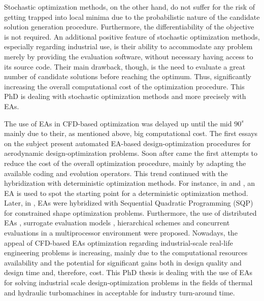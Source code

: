 Stochastic optimization methods, on the other hand, do not suffer for the risk of getting trapped into local minima due to the probabilistic nature of the candidate solution generation procedure. Furthermore, the differentiability of the objective is not required. An additional positive feature of stochastic optimization methods, especially regarding industrial use, is their ability to accommodate any problem merely by providing the evaluation software, without necessary having access to its source code. Their main drawback, though, is the need to evaluate a great number of candidate solutions before reaching the optimum. Thus, significantly increasing the overall computational cost of the optimization procedure. This PhD is dealing with  stochastic optimization methods and more precisely with EAs. 

The use of EAs in CFD-based optimization was delayed up until the mid $90^s$ mainly due to their, as mentioned above, big computational cost. The first essays on the subject \cite{kn:Quag95,per:95,kn:Gala96} present automated EA-based design-optimization procedures for aerodynamic design-optimization problems. Soon after came the first attempts to reduce the cost of the overall optimization procedure, mainly by adapting the available coding and evolution operators. This trend continued with the hybridization with deterministic optimization methods. For instance, in \cite{kn:Mar97} and \cite{kn:Fost97}, an EA is used to spot the starting point for a deterministic optimization method. Later, in \cite{dennis:99}, EAs were hybridized with Sequential Quadratic Programming (SQP) for constrained shape optimization problems. Furthermore,  the use of distributed EAs \cite{kn:Door1997,kn:SefrThes}, surrogate evaluation models \cite{kn:Ratl98,kn:Gio99,kn:Gian1999,kn:EBNK,phd_Kampolis}, hierarchical schemes \cite{kn:Eby1998,kn:Sef2000,knowles00mpaes_x41,desideri03,phd_Kampolis} and concurrent evaluations in a multiprocessor environment  \cite{kn:LeeH96,phd_Giotis,phd_Vera} were proposed. Nowadays, the appeal of CFD-based EAs optimization regarding industrial-scale real-life engineering problems is increasing, mainly due to the  computational resources availability and the potential for significant gains both in design quality and design time and, therefore, cost.  This PhD thesis is dealing with the use of EAs for solving industrial scale design-optimization problems in the fields of thermal and hydraulic turbomachines in acceptable for industry turn-around time.   


